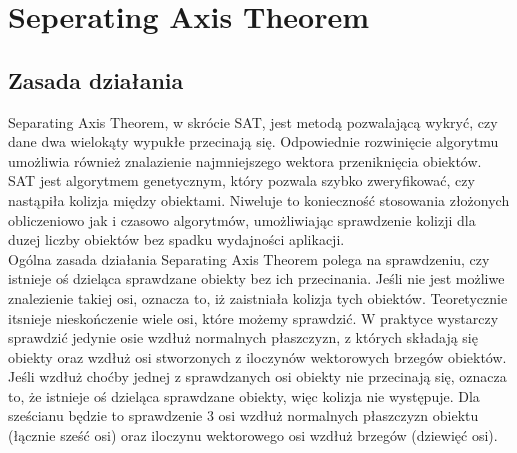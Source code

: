 \chapter{Seperating Axis Theorem}

\section{Zasada działania}
Separating Axis Theorem, w skrócie SAT, jest metodą pozwalającą wykryć, czy dane dwa wielokąty wypukłe przecinają się. Odpowiednie rozwinięcie algorytmu umożliwia również znalazienie najmniejszego wektora przeniknięcia obiektów.  SAT jest algorytmem genetycznym, który pozwala szybko zweryfikować, czy nastąpiła kolizja między obiektami. Niweluje to konieczność stosowania złożonych obliczeniowo jak i czasowo algorytmów, umożliwiając sprawdzenie kolizji dla duzej liczby obiektów bez spadku wydajności aplikacji.\\
Ogólna zasada działania Separating Axis Theorem polega na sprawdzeniu, czy istnieje oś dzieląca sprawdzane obiekty bez ich przecinania. Jeśli nie jest możliwe znalezienie takiej osi, oznacza to, iż zaistniała kolizja tych obiektów. Teoretycznie itsnieje nieskończenie wiele osi, które możemy sprawdzić. W praktyce wystarczy sprawdzić jedynie osie wzdłuż normalnych płaszczyzn, z których składają się obiekty oraz wzdłuż osi stworzonych z iloczynów wektorowych brzegów obiektów. Jeśli wzdłuż choćby jednej z sprawdzanych osi obiekty nie przecinają się, oznacza to, że istnieje oś dzieląca sprawdzane obiekty, więc kolizja nie występuje. Dla sześcianu będzie to sprawdzenie 3 osi wzdłuż normalnych płaszczyzn obiektu (łącznie sześć osi) oraz iloczynu wektorowego osi wzdłuż brzegów (dziewięć osi). \\

